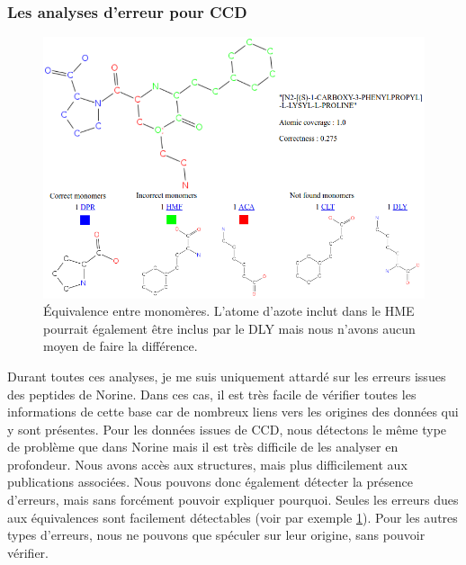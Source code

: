 \subsubsection{Les analyses d'erreur pour CCD}

\begin{figure}[h!]
  \begin{center}
    \includegraphics[width=450px]{Figures/s2m/results/CCD_results.png}
    \caption{\label{CCD_results}Équivalence entre monomères.
    L'atome d'azote inclut dans le HME pourrait également être inclus par le DLY mais nous n'avons aucun moyen de faire la différence.}
  \end{center}
\end{figure}

Durant toutes ces analyses, je me suis uniquement attardé sur les erreurs issues des peptides de Norine.
Dans ces cas, il est très facile de vérifier toutes les informations de cette base car de nombreux liens vers les origines des données qui y sont présentes.
Pour les données issues de CCD, nous détectons le même type de problème que dans Norine mais il est très difficile de les analyser en profondeur.
Nous avons accès aux structures, mais plus difficilement aux publications associées.
Nous pouvons donc également détecter la présence d'erreurs, mais sans forcément pouvoir expliquer pourquoi.
Seules les erreurs dues aux équivalences sont facilement détectables (voir par exemple \ref{CCD_results}).
Pour les autres types d'erreurs, nous ne pouvons que spéculer sur leur origine, sans pouvoir vérifier.